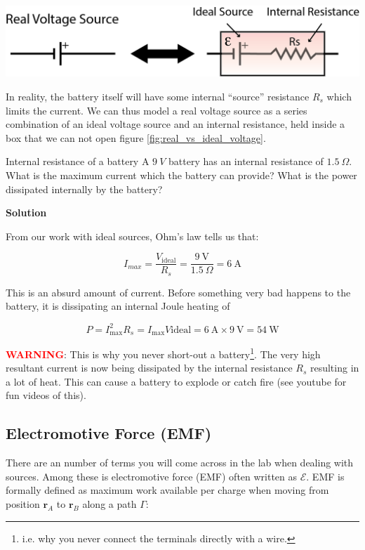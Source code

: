 \documentclass{tufte-book}
\newcommand\Solution{\par\textbf{\textsf{Solution}}\par\medskip}
\begin{document}
\begin{marginfigure}
\caption{A real voltage source is modeled as an ideal source in series with an internal resistance.}
\label{fig:real_vs_ideal_voltage}
\includegraphics{real_vs_ideal_voltage}
\end{marginfigure}

In reality, the battery itself will have some internal ``source'' resistance $R_s$ which limits the current. We can thus model a real voltage source as a series combination of an ideal voltage source and an internal resistance, held inside a box that we can not open figure \ref{fig:real_vs_ideal_voltage}.



\begin{myexample}[label = ex:popquiz_intresistance]{Internal resistance of a battery}
A $9~V$ battery has an internal resistance of $1.5~\Omega$. What is the maximum current which the battery can provide? What is the power dissipated internally by the battery?

\Solution
From our work with ideal sources, Ohm's law tells us that:

$$
I_{max} = \frac{V_\text{ideal}}{R_s} = \frac{9~\text{V}}{1.5~\Omega} = 6~\text{A}
$$

\noindent This is an absurd amount of current. Before something very bad happens to the battery, it is dissipating an internal Joule heating of

$$
P = I^2_\text{max}R_s = I_\text{max}V\text{ideal} = 6~\text{A}\times9~\text{V} = 54~\text{W}
$$
\end{myexample}

\noindent  \textcolor{red}{\textbf{WARNING}}: This is why you never short-out a battery\footnote{i.e. why you never connect the terminals directly with a wire.}. The very high resultant current is now being dissipated by the internal resistance $R_s$ resulting in a lot of heat. This can cause a battery to explode or catch fire (see youtube for fun videos of this).

\subsection{Electromotive Force (EMF)}
There are an number of terms you will come across in the lab when dealing with sources. Among these is electromotive force (EMF) often written as $\mathcal{E}$. EMF is formally defined as maximum work available per charge when moving from position $\textbf{r}_A$ to $\textbf{r}_B$ along a path $\Gamma$:
\end{document}
